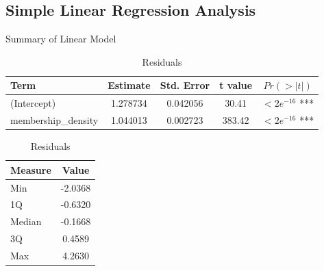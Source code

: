 \documentclass[11pt]{article}\usepackage[]{graphicx}\usepackage[]{xcolor}
\begin{document}
\subsection{Simple Linear Regression Analysis}
\begin{table}[ht]
\centering
\begin{minipage}[b]{0.48\linewidth}
\centering
\caption{Summary of Linear Model}
\begin{tabular}{@{}lcccc@{}}
\toprule
Term                & Estimate  & Std. Error & t value & $Pr(>|t|)$      \\ 
\midrule
(Intercept)         & 1.278734  & 0.042056   & 30.41   & $<2e^{-16}$ *** \\
membership\_density & 1.044013  & 0.002723   & 383.42  & $<2e^{-16}$ *** \\
\bottomrule
\end{tabular}
\label{tab:modelsummary}
\end{minipage}\hfill
\begin{minipage}[b]{0.48\linewidth}
\centering
\caption{Residuals}
\begin{tabular}{@{}lc@{}}
\toprule
Measure & Value      \\ 
\midrule
Min     & -2.0368    \\
1Q      & -0.6320    \\
Median  & -0.1668    \\
3Q      & 0.4589     \\
Max     & 4.2630     \\
\bottomrule
\end{tabular}
\label{tab:residuals}
\end{minipage}
\end{table}
\end{document}
